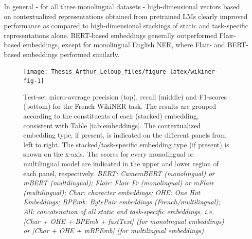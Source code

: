\documentclass[12pt,a4paper,]{book}
\begin{document}
In general - for all three monolingual datasets - high-dimensional vectors based on contextualized representations obtained from pretrained LMs clearly improved performance as compared to high-dimensional stackings of static and task-specific representations alone. BERT-based embeddings generally outperformed Flair-based embeddings, except for monolingual English NER, where Flair- and BERT-based embeddings performed similarly.

\begin{figure}

{\centering \texttt{[image: Thesis\_Arthur\_Leloup\_files/figure-latex/wikiner-fig-1]} 

}

\caption{Test-set micro-average precision (top), recall (middle) and F1-scores (bottom) for the French WikiNER task. The results are grouped according to the constituents of each (stacked) embedding, consistent with Table \ref{tab:embeddings}. The contextualized embedding type, if present, is indicated on the different panels from left to right. The stacked/task-specific embedding type (if present) is shown on the x-axis. The scores for every monolingual or multilingual model are indicated in the upper and lower region of each panel, respectively. \emph{BERT: CamemBERT (monolingual) or mBERT (multilingual); Flair: Flair Fr (monolingual) or mFlair (multilingual); Char: character embeddings; OHE: One Hot Embeddings; BPEmb: BytePair embeddings (French/multilingual); All: concatenation of all static and task-specific embeddings, i.e. {[}Char + OHE + BPEmb + fastText{]} (for monolingual embeddings) or {[}Char + OHE + mBPEmb{]} (for multilingual embeddings).}}\label{fig:wikiner-fig}
\end{figure}
\end{document}
